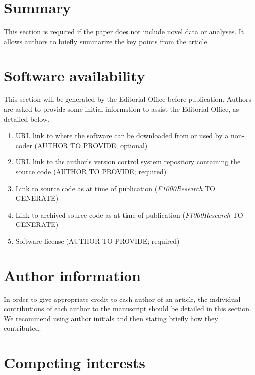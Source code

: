 \documentclass[9pt,a4paper,]{extarticle}
\begin{document}
\hypertarget{summary}{%
\section{Summary }\label{summary}}

This section is required if the paper does not include novel data or analyses. It allows authors to briefly summarize the key points from the article.

\hypertarget{software-availability}{%
\section{Software availability}\label{software-availability}}

This section will be generated by the Editorial Office before publication. Authors are asked to provide some initial information to assist the Editorial Office, as detailed below.

\begin{enumerate}
\def\labelenumi{\arabic{enumi}.}
\item
  URL link to where the software can be downloaded from or used by a non-coder (AUTHOR TO PROVIDE; optional)
\item
  URL link to the author's version control system repository containing the source code (AUTHOR TO PROVIDE; required)
\item
  Link to source code as at time of publication (\emph{F1000Research} TO GENERATE)
\item
  Link to archived source code as at time of publication (\emph{F1000Research} TO GENERATE)
\item
  Software license (AUTHOR TO PROVIDE; required)
\end{enumerate}

\hypertarget{author-information}{%
\section{Author information}\label{author-information}}

In order to give appropriate credit to each author of an article, the individual contributions of each author to the manuscript should be detailed in this section. We recommend using author initials and then stating briefly how they contributed.

\hypertarget{competing-interests}{%
\section{Competing interests}\label{competing-interests}}
\end{document}
